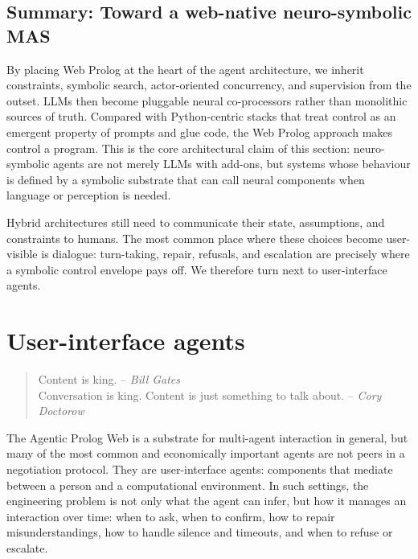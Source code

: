 \subsection{Summary: Toward a web-native neuro-symbolic MAS}
\label{sec:summary-toward-web-native-neuro-symbolic}

By placing Web Prolog at the heart of the agent architecture, we inherit constraints, symbolic search, actor-oriented concurrency, and supervision from the outset. LLMs then become pluggable neural co-processors rather than monolithic sources of truth. Compared with Python-centric stacks that treat control as an emergent property of prompts and glue code, the Web Prolog approach makes control a program. This is the core architectural claim of this section: neuro-symbolic agents are not merely LLMs with add-ons, but systems whose behaviour is defined by a symbolic substrate that can call neural components when language or perception is needed.

Hybrid architectures still need to communicate their state, assumptions, and constraints to humans. The most common place where these choices become user-visible is dialogue: turn-taking, repair, refusals, and escalation are precisely where a symbolic control envelope pays off. We therefore turn next to user-interface agents.

\section{User-interface agents}
\label{sec:embodied-agents}

\begin{quotation}
\flushright Content is king. -- \textit{Bill Gates} \\
\flushright Conversation is king. Content is just something to talk about. -- \textit{Cory Doctorow}
\end{quotation}

\vspace{0.5cm}

\noindent The Agentic Prolog Web is a substrate for multi-agent interaction in general, but many of the most common and economically important agents are not peers in a negotiation protocol. They are user-interface agents: components that mediate between a person and a computational environment. In such settings, the engineering problem is not only what the agent can infer, but how it manages an interaction over time: when to ask, when to confirm, how to repair misunderstandings, how to handle silence and timeouts, and when to refuse or escalate.

